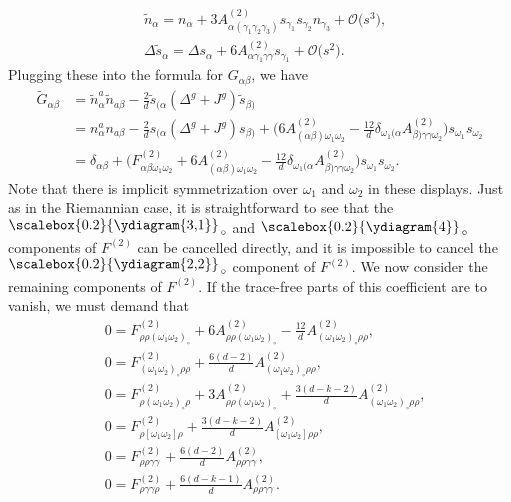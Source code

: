 \begin{align*}
&\tilde{n}_{\alpha}= n_{\alpha} + 3 A^{(2)}_{\alpha (\gamma_1 \gamma_2 \gamma_3)} s_{\gamma_1} s_{\gamma_2} n_{\gamma_3} + \mathcal{O}\bigl(s^3\bigr), \\
&\Delta \tilde{s}_{\alpha}= \Delta s_{\alpha} + 6 A^{(2)}_{\alpha \gamma_1 \gamma \gamma} s_{\gamma_1} + \mathcal{O}\bigl(s^2\bigr) .
\end{align*}
Plugging these into the formula for $G_{\alpha \beta}$, we have
\begin{align*}
\tilde{G}_{\alpha \beta} &{}= \tilde{n}^a_{\alpha} \tilde{n}_{a \beta} - \frac{2}{d} \tilde{s}_{(\alpha} (\Delta^g + J^g) \tilde{s}_{\beta)} \\
&{}= n^a_{\alpha} n_{a \beta} - \frac{2}{d} s_{(\alpha} (\Delta^g + J^g) s_{\beta)} + \biggl(6 A^{(2)}_{(\alpha \beta) \omega_1 \omega_2} - \frac{12}{d} \delta_{\omega_1 (\alpha} A^{(2)}_{\beta) \gamma \gamma \omega_2}\biggr) s_{\omega_1} s_{\omega_2} \\
&{}= \delta_{\alpha \beta} + \biggl(F^{(2)}_{\alpha \beta \omega_1 \omega_2} + 6 A^{(2)}_{(\alpha \beta) \omega_1 \omega_2} - \frac{12}{d} \delta_{\omega_1 (\alpha} A^{(2)}_{\beta) \gamma \gamma \omega_2}\biggr) s_{\omega_1} s_{\omega_2} .
\end{align*}
Note that there is implicit symmetrization over $\omega_1$ and $\omega_2$ in these displays. Just as in the Riemannian case, it is straightforward to see that the $ \raisebox{2.5pt}{\scalebox{0.2}{\ydiagram{3,1}}}_{\,\circ}$ and $\raisebox{1.5pt}{\scalebox{0.2}{\ydiagram{4}}}_{\,\circ} $ components of $F^{(2)}$ can be cancelled directly, and it is impossible to cancel the $\raisebox{2.5pt}{\scalebox{0.2}{\ydiagram{2,2}}}_{\,\circ}$ component of $F^{(2)}$.
We now consider the remaining components of $F^{(2)}$. If the trace-free parts of this coefficient are to vanish, we must demand that
\begin{align*}
&0= F^{(2)}_{\rho \rho (\omega_1 \omega_2)_\circ} + 6 A^{(2)}_{\rho \rho (\omega_1 \omega_2)_\circ} - \frac{12}{d} A^{(2)}_{(\omega_1 \omega_2)_\circ \rho \rho}, \\
&0
= F^{(2)}_{(\omega_1 \omega_2)_\circ \rho \rho} + \frac{6(d-2)}{d} A^{(2)}_{(\omega_1 \omega_2)_\circ \rho \rho}, \\
&0
= F^{(2)}_{\rho (\omega_1 \omega_2)_\circ \rho} + 3 A^{(2)}_{\rho \rho (\omega_1 \omega_2)_\circ} + \frac{3(d-k-2)}{d} A^{(2)}_{(\omega_1 \omega_2)_\circ \rho \rho}, \\
&0
= F^{(2)}_{\rho [\omega_1 \omega_2] \rho} + \frac{3(d-k-2)}{d} A^{(2)}_{[\omega_1 \omega_2] \rho \rho}, \\
&0
= F^{(2)}_{\rho \rho \gamma \gamma} + \frac{6(d-2)}{d} A^{(2)}_{\rho \rho \gamma \gamma}, \\
&0
= F^{(2)}_{\rho \gamma \gamma \rho} + \frac{6(d-k-1)}{d} A^{(2)}_{\rho \rho \gamma \gamma} .
\end{align*}

